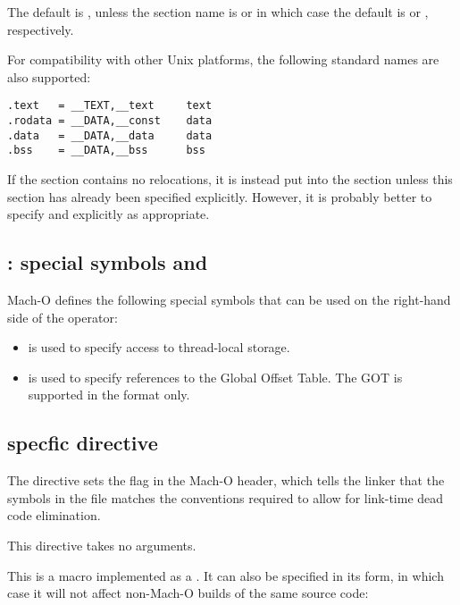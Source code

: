 The default is , unless the section name is  or
 in which case the default is  or ,
respectively.

For compatibility with other Unix platforms, the following standard
names are also supported:

\begin{lstlisting}
.text   = __TEXT,__text     text
.rodata = __DATA,__const    data
.data   = __DATA,__data     data
.bss    = __DATA,__bss      bss
\end{lstlisting}

If the  section contains no relocations, it is instead put
into the  section unless this section has already
been specified explicitly. However, it is probably better to specify
 and  explicitly as appropriate.

\subsection{:
 special symbols and }
\label{subsec:machotls}

Mach-O defines the following special symbols that can be used on the
right-hand side of the  operator:

\begin{itemize}
    \item{ is used to specify access to thread-local storage.}
    \item{ is used to specify references to the Global Offset Table.
        The GOT is supported in the  format only.}
\end{itemize}

\subsection{ specfic directive }
\label{subsec:macho-ssvs}

The directive  sets the
 flag in the Mach-O header, which tells
the linker that the symbols in the file matches the conventions
required to allow for link-time dead code elimination.

This directive takes no arguments.

This is a macro implemented as a . It can also be
specified in its  form, in which case it will not affect
non-Mach-O builds of the same source code:

